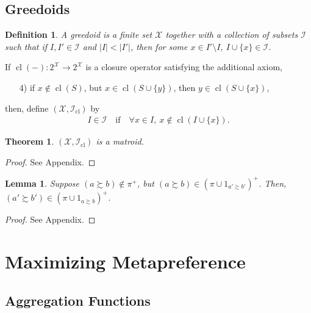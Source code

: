 \documentclass[conference]{ieeeconf}
\newcommand{\powerset}[1]{2^{#1}}
\newcommand{\X}{\mathcal{X}}
\newcommand{\I}{\mathcal{I}}
\newcommand{\prefers}{\succsim}
\DeclareMathOperator{\cl}{cl}
\newtheorem{theorem}{Theorem}
\newtheorem{lemma}{Lemma}
\newtheorem{definition}{Definition}
\begin{document}
\subsection{Greedoids}

\begin{definition}
    A \emph{greedoid} is a finite set $\X$ together with a collection of subsets $\I$ such that if $I, I' \in \mathcal{I}$ and $|I| < |I'|$, then for some $x \in I' \setminus I$, $I \cup \{x\} \in \I$.
\end{definition}
If $\cl(-): \powerset{\X} \to \powerset{\X}$ is a closure operator satisfying the additional axiom,
\begin{enumerate}
    \item[4)] if $x \notin \cl(S)$, but $x \in \cl(S \cup \{y\})$, then $y \in \cl(S \cup \{x\})$,
\end{enumerate}
then, define $(\X,\I_{\cl})$ by
\begin{align*}
    I \in \I \quad \text{if} \quad \forall x \in I,~x \notin \cl(I \cup \{x\}).
\end{align*}
\begin{theorem}
    $(\X, \I_{\cl})$ is a matroid.
\end{theorem}
\begin{proof}
    See Appendix.
\end{proof}

\begin{lemma}
    Suppose $(a \prefers b) \notin \pi^{+}$, but $(a \prefers b) \in \left(\pi \cup 1_{a' \prefers b'}\right)^{+}$. Then, $(a' \prefers b') \in \left( \pi \cup 1_{a \prefers b} \right)^{+}$.
\end{lemma}
\begin{proof}
    See Appendix.
\end{proof}


\section{Maximizing Metapreference}

\subsection{Aggregation Functions}
\end{document}
